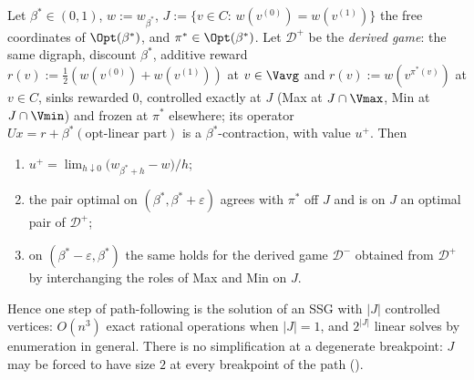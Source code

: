 \begin{theorem}\label{pp:step}
Let $\beta^{\ast}\in(0,1)$, $w:=w_{\beta^{\ast}}$,
$J:=\{v\in C:\,w(v^{(0)})=w(v^{(1)})\}$ the free coordinates of
$\Opt(\beta^{\ast})$, and $\pi^{\ast}\in\Opt(\beta^{\ast})$. Let $\mathcal D^{+}$
be the \emph{derived game}: the same digraph, discount $\beta^{\ast}$, additive
reward $r(v):=\tfrac12(w(v^{(0)})+w(v^{(1)}))$ at $v\in\Vavg$ and
$r(v):=w(v^{\pi^{\ast}(v)})$ at $v\in C$, sinks rewarded $0$, controlled exactly
at $J$ (Max at $J\cap\Vmax$, Min at $J\cap\Vmin$) and frozen at $\pi^{\ast}$
elsewhere; its operator $Ux=r+\beta^{\ast}(\text{opt-linear part})$ is a
$\beta^{\ast}$-contraction, with value $u^{+}$. Then
\begin{enumerate}[label=(\roman*),leftmargin=2.2em]
\item $u^{+}=\lim_{h\downarrow0}\bigl(w_{\beta^{\ast}+h}-w\bigr)/h$;
\item the pair optimal on $(\beta^{\ast},\beta^{\ast}+\varepsilon)$ agrees with
  $\pi^{\ast}$ off $J$ and is on $J$ an optimal pair of $\mathcal D^{+}$;
\item on $(\beta^{\ast}-\varepsilon,\beta^{\ast})$ the same holds for the derived
  game $\mathcal D^{-}$ obtained from $\mathcal D^{+}$ by interchanging the roles
  of Max and Min on $J$.
\end{enumerate}
Hence one step of path-following is the solution of an SSG with $|J|$ controlled
vertices: $O(n^{3})$ exact rational operations when $|J|=1$, and
$2^{|J|}$ linear solves by enumeration in general. There is no simplification
at a degenerate breakpoint: $J$ may be forced to have size $2$ at every
breakpoint of the path ().
\end{theorem}

